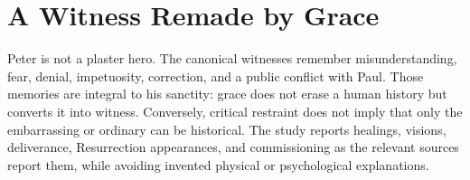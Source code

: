 \section{A Witness Remade by Grace}

Peter is not a plaster hero. The canonical witnesses remember misunderstanding,
fear, denial, impetuosity, correction, and a public conflict with Paul. Those
memories are integral to his sanctity: grace does not erase a human history but
converts it into witness. Conversely, critical restraint does not imply that
only the embarrassing or ordinary can be historical. The study reports
healings, visions, deliverance, Resurrection appearances, and commissioning as
the relevant sources report them, while avoiding invented physical or
psychological explanations.
